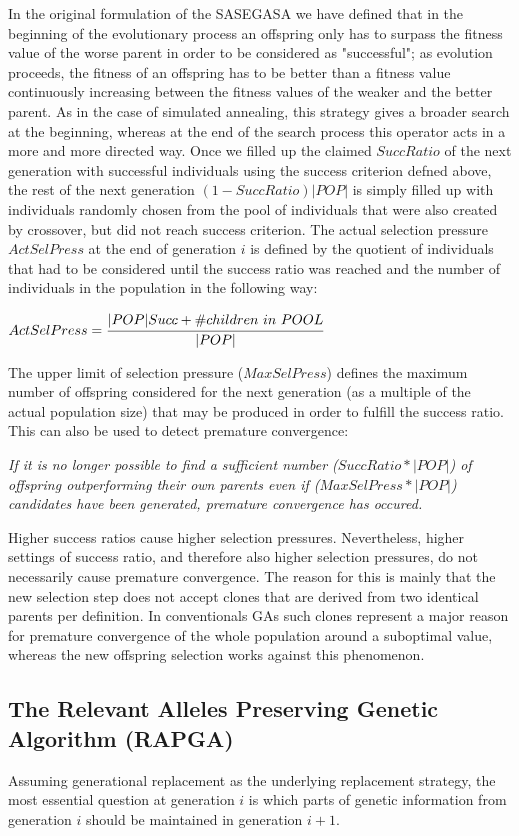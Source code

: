 \documentclass[12pt]{article}
\begin{document}
In the original formulation of the SASEGASA we have defined that in the beginning of the evolutionary process an offspring only has to surpass the fitness value of the worse parent in order to be considered as "successful"; as evolution proceeds, the fitness of an offspring has to be better than a fitness value continuously increasing between the fitness values of the weaker and the better parent. As in the case of simulated annealing, this strategy gives a broader search at the beginning, whereas at the end of the search process this operator acts in a more and more directed way. Once we filled up the claimed $SuccRatio$ of the next generation with successful individuals using the success criterion defned above, the rest of the next generation $(1-SuccRatio)|POP|$ is simply filled up with individuals randomly chosen from the pool of individuals that were also created by crossover, but did not reach success criterion. The actual selection pressure $ActSelPress$ at the end of generation $i$ is defined by the quotient of individuals that had to be considered until the success ratio was reached and the number of individuals in the population in the following way:
\begin{center}
$ActSelPress = \cfrac{|POP|Succ+\#children\ in\ POOL}{|POP|}$
\end{center}
The upper limit of selection pressure ($MaxSelPress$) defines the maximum number of offspring considered for the next generation (as a multiple of the actual population size) that may be produced in order to fulfill the success ratio. This can also be used to detect premature convergence:


\textit{If it is no longer possible to find a sufficient number ($SuccRatio*|POP|$) of offspring outperforming their own parents even if ($MaxSelPress*|POP|$) candidates have been generated, premature convergence has occured.}

Higher success ratios cause higher selection pressures. Nevertheless, higher settings of success ratio, and therefore also higher selection pressures, do not necessarily cause premature convergence. The reason for this is mainly that the new selection step does not accept clones that are derived from two identical parents per definition. In conventionals GAs such clones represent a major reason for premature convergence of the whole population around a suboptimal value, whereas the new offspring selection works against this phenomenon.

\subsection{The Relevant Alleles Preserving Genetic Algorithm (RAPGA)}
Assuming generational replacement as the underlying replacement strategy, the most essential question at generation $i$ is which parts of genetic information from generation $i$ should be maintained in generation $i+1$.
\end{document}
